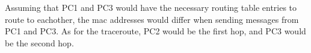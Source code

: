 Assuming that PC1 and PC3 would have the necessary routing table entries to route to eachother, the mac addresses would differ when sending messages from PC1 and PC3. As for the traceroute, PC2 would be the first hop, and PC3 would be the second hop. \\

